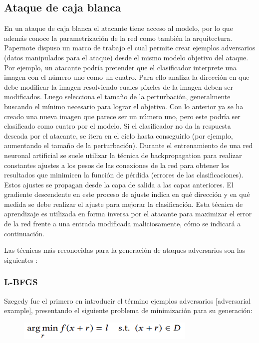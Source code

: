\subsection{Ataque de caja blanca}

En un ataque de caja blanca el atacante tiene acceso al modelo, por lo que además conoce la parametrización de la red como también la arquitectura. Papernote dispuso un marco de trabajo \parencite{r40} el cual permite crear ejemplos adversarios (datos manipulados para el ataque) desde el mismo modelo objetivo del ataque. Por ejemplo, un atacante podría pretender que el clasificador interprete una imagen con el número uno como un cuatro. Para ello analiza la dirección en que debe modificar la imagen resolviendo cuales píxeles de la imagen deben ser modificados. Luego selecciona el tamaño de la perturbación, generalmente buscando el mínimo necesario para lograr el objetivo. Con lo anterior ya se ha creado una nueva imagen que parece ser un número uno, pero este podría ser clasificado como cuatro por el modelo. Si el clasificador no da la respuesta deseada por el atacante, se itera en el ciclo hasta conseguirlo (por ejemplo, aumentando el tamaño de la perturbación). 
Durante el entrenamiento de una red neuronal artificial se suele utilizar la técnica de backpropagation para realizar constantes ajustes a los pesos de las conexiones de la red para obtener los resultados que minimicen la función de pérdida (errores de las clasificaciones). Estos ajustes se propagan desde la capa de salida a las capas anteriores. El gradiente descendente en este proceso de ajuste indica en qué dirección y en qué medida se debe realizar el ajuste para mejorar la clasificación. Esta técnica de aprendizaje es utilizada en forma inversa por el atacante para maximizar el error de la red frente a una entrada modificada maliciosamente, cómo se indicará a continuación. 

Las técnicas más reconocidas para la generación de ataques adversarios son las siguientes \parencite{r19}:

\subsubsection{L-BFGS}

Szegedy \parencite{r4} fue el primero en introducir el término ejemplos adversarios [adversarial example], presentando el siguiente problema de minimización para su generación:

\begin{figure}[th]
\centering
\includegraphics [scale = 0.75]{Figures/formula1.PNG}
\label{fig:f1}
\end{figure}

